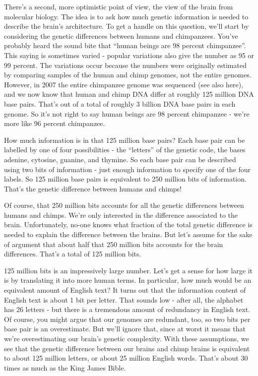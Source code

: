 There's a second, more optimistic point of view, the view of the brain from molecular biology. The idea is to ask how much genetic information is needed to describe the brain's architecture. To get a handle on this question, we'll start by considering the genetic differences between humans and chimpanzees. You've probably heard the sound bite that ``human beings are 98 percent chimpanzee''. This saying is sometimes varied - popular variations also give the number as 95 or 99 percent. The variations occur because the numbers were originally estimated by comparing samples of the human and chimp genomes, not the entire genomes. However, in 2007 the entire chimpanzee genome was sequenced (see also here), and we now know that human and chimp DNA differ at roughly 125 million DNA base pairs. That's out of a total of roughly 3 billion DNA base pairs in each genome. So it's not right to say human beings are 98 percent chimpanzee - we're more like 96 percent chimpanzee.


How much information is in that 125 million base pairs? Each base pair can be labelled by one of four possibilities - the ``letters'' of the genetic code, the bases adenine, cytosine, guanine, and thymine. So each base pair can be described using two bits of information - just enough information to specify one of the four labels. So 125 million base pairs is equivalent to 250 million bits of information. That's the genetic difference between humans and chimps!


Of course, that 250 million bits accounts for all the genetic differences between humans and chimps. We're only interested in the difference associated to the brain. Unfortunately, no-one knows what fraction of the total genetic difference is needed to explain the difference between the brains. But let's assume for the sake of argument that about half that 250 million bits accounts for the brain differences. That's a total of 125 million bits.


125 million bits is an impressively large number. Let's get a sense for how large it is by translating it into more human terms. In particular, how much would be an equivalent amount of English text? It turns out that the information content of English text is about 1 bit per letter. That sounds low - after all, the alphabet has 26 letters - but there is a tremendous amount of redundancy in English text. Of course, you might argue that our genomes are redundant, too, so two bits per base pair is an overestimate. But we'll ignore that, since at worst it means that we're overestimating our brain's genetic complexity. With these assumptions, we see that the genetic difference between our brains and chimp brains is equivalent to about 125 million letters, or about 25 million English words. That's about 30 times as much as the King James Bible.


